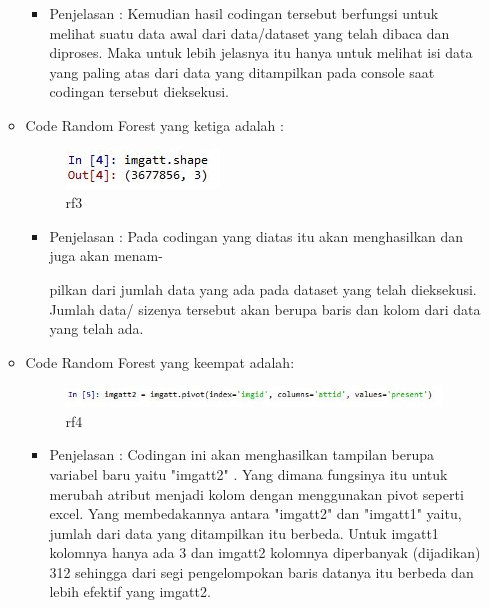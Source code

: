 \begin{enumerate}
\begin{itemize}
\begin{itemize}
\item Penjelasan : Kemudian hasil codingan tersebut berfungsi untuk melihat suatu data awal dari data/dataset yang telah dibaca dan diproses. Maka untuk lebih jelasnya itu hanya untuk melihat isi data yang paling atas dari data yang ditampilkan pada console saat codingan tersebut dieksekusi.
\par
\par
\end{itemize}
\item Code Random Forest yang ketiga adalah :
\par
\begin{figure}[ht]
\centering
\includegraphics[scale=0.4]{figures/rfcahya3.jpg}
\caption{rf3}
\label{contoh}
\end{figure}
\par
\begin{itemize}
\item Penjelasan : Pada codingan yang diatas itu akan menghasilkan dan juga akan  menam-
\par pilkan dari jumlah data yang ada pada dataset yang telah dieksekusi. Jumlah data/ sizenya tersebut akan berupa baris dan kolom dari data yang telah ada.
\par
\par
\end{itemize}
\item Code Random Forest yang keempat adalah:
\par
\begin{figure}[ht]
\centering
\includegraphics[scale=0.4]{figures/rfcahya4.jpg}
\caption{rf4}
\label{contoh}
\end{figure}
\par
\begin{itemize}
\item Penjelasan : Codingan ini akan menghasilkan tampilan berupa variabel baru yaitu "imgatt2" . Yang dimana fungsinya itu untuk merubah atribut menjadi kolom dengan menggunakan pivot seperti excel. Yang membedakannya antara "imgatt2" dan "imgatt1" yaitu, jumlah dari data yang ditampilkan itu berbeda. Untuk imgatt1 kolomnya hanya ada 3 dan imgatt2 kolomnya diperbanyak (dijadikan) 312 sehingga dari segi pengelompokan baris datanya itu berbeda dan lebih efektif yang imgatt2. 

\end{itemize}
\end{itemize}
\end{enumerate}
